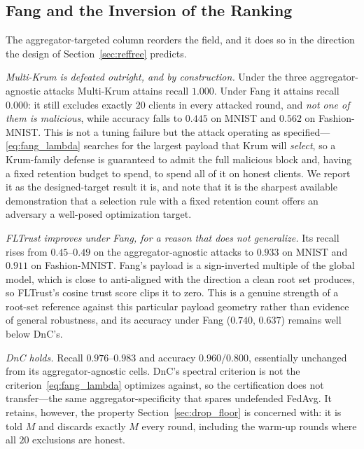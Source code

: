 \documentclass[journal]{IEEEtran}
\begin{document}
\subsection{Fang and the Inversion of the Ranking}
\label{sec:fang_results}

The aggregator-targeted column reorders the field, and it does so in the direction the design of Section~\ref{sec:reffree} predicts.

\noindent\textit{Multi-Krum is defeated outright, and by construction.} Under the three aggregator-agnostic attacks Multi-Krum attains recall $1.000$. Under Fang it attains recall $\mathbf{0.000}$: it still excludes exactly $20$ clients in every attacked round, and \emph{not one of them is malicious}, while accuracy falls to $0.445$ on MNIST and $0.562$ on Fashion-MNIST. This is not a tuning failure but the attack operating as specified---\eqref{eq:fang_lambda} searches for the largest payload that Krum will \emph{select}, so a Krum-family defense is guaranteed to admit the full malicious block and, having a fixed retention budget to spend, to spend all of it on honest clients. We report it as the designed-target result it is, and note that it is the sharpest available demonstration that a selection rule with a fixed retention count offers an adversary a well-posed optimization target.

\noindent\textit{FLTrust improves under Fang, for a reason that does not generalize.} Its recall rises from $0.45$--$0.49$ on the aggregator-agnostic attacks to $0.933$ on MNIST and $0.911$ on Fashion-MNIST. Fang's payload is a sign-inverted multiple of the global model, which is close to anti-aligned with the direction a clean root set produces, so FLTrust's cosine trust score clips it to zero. This is a genuine strength of a root-set reference against this particular payload geometry rather than evidence of general robustness, and its accuracy under Fang ($0.740$, $0.637$) remains well below DnC's.

\noindent\textit{DnC holds.} Recall $0.976$--$0.983$ and accuracy $0.960$/$0.800$, essentially unchanged from its aggregator-agnostic cells. DnC's spectral criterion is not the criterion~\eqref{eq:fang_lambda} optimizes against, so the certification does not transfer---the same aggregator-specificity that spares undefended FedAvg. It retains, however, the property Section~\ref{sec:drop_floor} is concerned with: it is told $M$ and discards exactly $M$ every round, including the warm-up rounds where all $20$ exclusions are honest.
\end{document}
